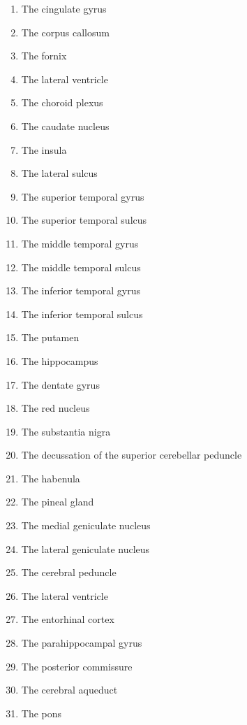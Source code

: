 \documentclass[]{book}
\providecommand{\tightlist}{%
  \setlength{\itemsep}{0pt}\setlength{\parskip}{0pt}}
\begin{document}
\begin{enumerate}
\def\labelenumi{\arabic{enumi}.}
\tightlist
\item
  The cingulate gyrus
\item
  The corpus callosum
\item
  The fornix
\item
  The lateral ventricle
\item
  The choroid plexus
\item
  The caudate nucleus
\item
  The insula
\item
  The lateral sulcus
\item
  The superior temporal gyrus
\item
  The superior temporal sulcus
\item
  The middle temporal gyrus
\item
  The middle temporal sulcus
\item
  The inferior temporal gyrus
\item
  The inferior temporal sulcus
\item
  The putamen
\item
  The hippocampus
\item
  The dentate gyrus
\item
  The red nucleus
\item
  The substantia nigra
\item
  The decussation of the superior cerebellar peduncle
\item
  The habenula
\item
  The pineal gland
\item
  The medial geniculate nucleus
\item
  The lateral geniculate nucleus
\item
  The cerebral peduncle
\item
  The lateral ventricle
\item
  The entorhinal cortex
\item
  The parahippocampal gyrus
\item
  The posterior commissure
\item
  The cerebral aqueduct
\item
  The pons
\end{enumerate}
\end{document}
